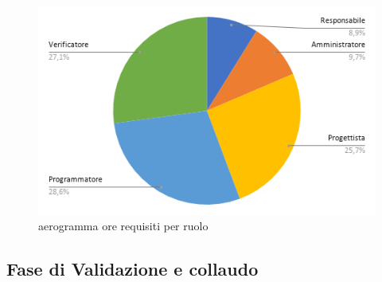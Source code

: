         \begin{figure}[!h]
            \caption{aerogramma ore requisiti per ruolo}
            \vspace{5px}
            \includegraphics[scale=0.5]{../../../Images/Diagrammi/Diagramma a torta/ore codifica.png}
            \centering
        \end{figure}  



\subsection{Fase di Validazione e collaudo}
